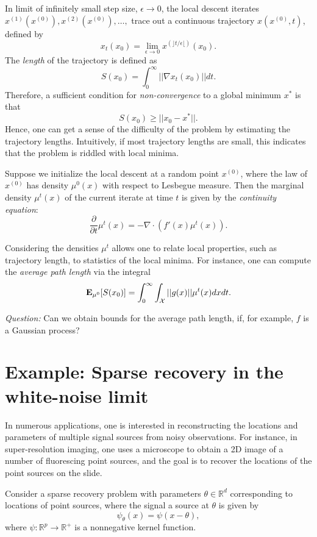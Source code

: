 \documentclass[11pt]{article}
\begin{document}
In limit of infinitely small step size, $\epsilon \to 0$, the local
descent iterates $x^{(1)}(x^{(0)}), x^{(2)}(x^{(0)}), \hdots, $ trace
out a continuous trajectory $x(x^{(0)}, t)$, defined by
\[
x_t(x_0) = \lim_{\epsilon \to 0} x^{(\rfloor t/\epsilon \lfloor)}(x_0).
\]
The \emph{length} of the trajectory is defined as
\[
S(x_0) = \int_0^\infty || \nabla x_t(x_0)|| dt.
\]
Therefore, a sufficient condition for \emph{non-convergence} to a global minimum $x^*$ is that
\[
S(x_0) \geq ||x_0 - x^*||.
\]
Hence, one can get a sense of the difficulty of the problem by
estimating the trajectory lengths.  Intuitively, if most trajectory
lengths are small, this indicates that the problem is riddled with
local minima.

Suppose we initialize the local descent at a random point $x^{(0)}$,
where the law of $x^{(0)}$ has density $\mu^0(x)$ with respect to
Lesbegue measure.  Then the marginal density $\mu^t(x)$ of the current
iterate at time $t$ is given by the \emph{continuity equation}:
\[
\frac{\partial}{\partial t} \mu^t(x) = -\nabla \cdot (f'(x) \mu^t(x)).
\]

Considering the densities $\mu^t$ allows one to relate local
properties, such as trajectory length, to statistics of the local
minima.  For instance, one can compute the \emph{average path length} via the integral
\[
\textbf{E}_{\mu^0}[S(x_0)] = \int_0^\infty \int_{\mathcal{X}} ||g(x)|| \mu^t(x) dx dt.
\]

\emph{Question:} Can we obtain bounds for the average path length, if,
for example, $f$ is a Gaussian process?

\section{Example: Sparse recovery in the white-noise limit}

In numerous applications, one is interested in reconstructing the
locations and parameters of multiple signal sources from noisy
observations.  For instance, in super-resolution imaging, one uses a
microscope to obtain a 2D image of a number of fluorescing point sources,
and the goal is to recover the locations of the point sources on the
slide.

Consider a sparse recovery problem with parameters $\theta \in
\mathbb{R}^d$ corresponding to locations of point sources, where the
signal a source at $\theta$ is given by
\[
\psi_\theta(x) = \psi(x - \theta),
\]
where $\psi: \mathbb{R}^p \to \mathbb{R}^+$ is a nonnegative kernel
function.  
\end{document}
